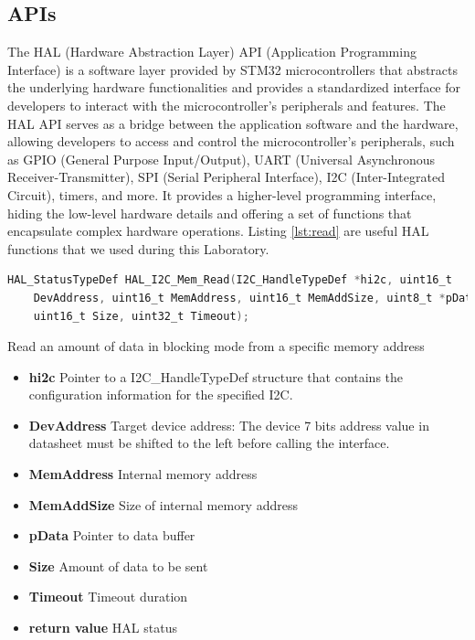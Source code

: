\documentclass[english]{article}
\begin{document}
\subsection{APIs}
The HAL (Hardware Abstraction Layer) API (Application Programming Interface) 
is a software layer provided by STM32 microcontrollers that abstracts
 the underlying hardware functionalities and provides a standardized 
 interface for developers to interact with the microcontroller's peripherals and features.
The HAL API serves as a bridge between the application software and the hardware, 
allowing developers to access and control the microcontroller's peripherals,
such as GPIO (General Purpose Input/Output), UART (Universal Asynchronous Receiver-Transmitter),
SPI (Serial Peripheral Interface), I2C (Inter-Integrated Circuit), 
timers, and more. It provides a higher-level programming interface,
hiding the low-level hardware details and offering a set of functions that
encapsulate complex hardware operations. \newline
Listing \ref{lst:read} are useful HAL functions that we used during this Laboratory.
\begin{lstlisting}[language=C, caption={Reading Register values}, label={lst:read} ]
HAL_StatusTypeDef HAL_I2C_Mem_Read(I2C_HandleTypeDef *hi2c, uint16_t
    DevAddress, uint16_t MemAddress, uint16_t MemAddSize, uint8_t *pData,
    uint16_t Size, uint32_t Timeout);
\end{lstlisting}
Read an amount of data in blocking mode from a specific memory address  
\begin{itemize}
    \item \textbf{hi2c} Pointer to a I2C\_HandleTypeDef structure that contains the configuration information
    for the specified I2C.
    \item \textbf{DevAddress} Target device address: The device 7 bits address value in datasheet must be
    shifted to the left before calling the interface.
    \item \textbf{MemAddress} Internal memory address
    \item \textbf{MemAddSize} Size of internal memory address
    \item \textbf{pData} Pointer to data buffer
    \item \textbf{Size} Amount of data to be sent
    \item \textbf{Timeout} Timeout duration
    \item \textbf{return value} HAL status
\end{itemize}
\end{document}
